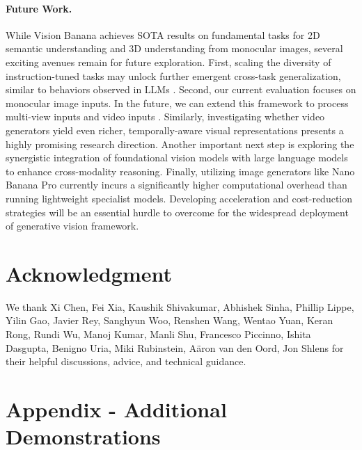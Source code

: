 \documentclass[11pt, a4paper, copyright, gdm]{google}
\begin{document}
\paragraph{Future Work.}
While Vision Banana achieves SOTA results on fundamental tasks for 2D semantic understanding and 3D understanding from monocular images, several exciting avenues remain for future exploration. 
First, scaling the diversity of instruction-tuned tasks may unlock further emergent cross-task generalization, similar to behaviors observed in LLMs \cite{wei2021finetuned_flan}.
Second, our current evaluation focuses on monocular image inputs.
In the future, we can extend this framework to process multi-view inputs \citep{wang2025vggt} and video inputs \citep{zhang2025d4rt}.
Similarly, investigating whether video generators yield even richer, temporally-aware visual representations presents a highly promising research direction.
Another important next step is exploring the synergistic integration of foundational vision models with large language models to enhance cross-modality reasoning.
Finally, utilizing image generators like Nano Banana Pro currently incurs a significantly higher computational overhead than running lightweight specialist models.
Developing acceleration and cost-reduction strategies will be an essential hurdle to overcome for the widespread deployment of generative vision framework.

\section*{Acknowledgment}
We thank 
Xi Chen, Fei Xia, 
Kaushik Shivakumar, Abhishek Sinha, Phillip Lippe, Yilin Gao, Javier Rey, Sanghyun Woo,
Renshen Wang, Wentao Yuan, Keran Rong, Rundi Wu,
Manoj Kumar, Manli Shu, Francesco Piccinno, Ishita Dasgupta, 
Benigno Uria, Miki Rubinstein, Aäron van den Oord, Jon Shlens
for their helpful discussions, advice, and technical guidance.




\newpage

\section*{Appendix - Additional Demonstrations}
\end{document}

